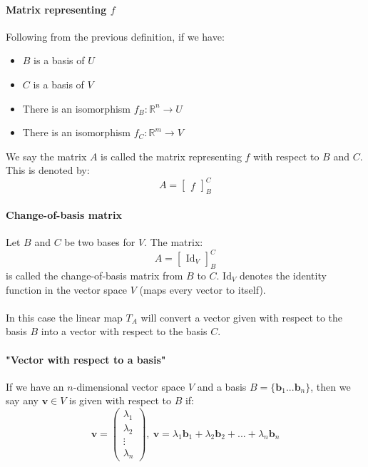 \documentclass{article}
\newcommand{\R}{\mathbb{R}}
\renewcommand{\vec}[1]{\mathbf{#1}}
\begin{document}
\paragraph{Matrix representing $ f $}
Following from the previous definition, if we have:
\begin{itemize}
\item $ B $ is a basis of $ U $
\item $ C $ is a basis of $ V $
\item There is an isomorphism $ f_{B} : \R^{n} \to U $
\item There is an isomorphism $ f_{C} : \R^{m} \to V $
\end{itemize}
We say the matrix $ A $ is called the matrix representing $ f $ with respect to $ B $ and $ C $. This is denoted by:
\begin{equation}
A =
\begin{bmatrix}
f
\end{bmatrix}_{B}^{C}
\end{equation}
\paragraph{Change-of-basis matrix}
Let $ B $ and $ C $ be two bases for $ V $. The matrix:
\begin{equation}
A =
\begin{bmatrix}
\textrm{Id}_{V}
\end{bmatrix}_{B}^{C}
\end{equation}
is called the change-of-basis matrix from $ B $ to $ C $. $ \textrm{Id}_{V} $ denotes the identity function in the vector space $ V $ (maps every vector to itself).
\\\\
In this case the linear map $ T_{A} $ will convert a vector given with respect to the basis $ B $ into a vector with respect to the basis $ C $.
\paragraph{"Vector with respect to a basis"}
If we have an $ n $-dimensional vector space $ V $ and a basis $ B = \{\vec{b}_{1} ... \vec{b}_{n} \} $, then we say any $ \vec{v} \in V $  is given with respect to $ B $ if:
\begin{equation}
\vec{v} = 
\begin{pmatrix}
\lambda_{1} \\ \lambda_{2} \\ \vdots \\ \lambda_{n}
\end{pmatrix} , \ 
\vec{v} = \lambda_{1}\vec{b}_{1} + \lambda_{2}\vec{b}_{2} + ... + \lambda_{n}\vec{b}_{n}
\end{equation}
\end{document}
